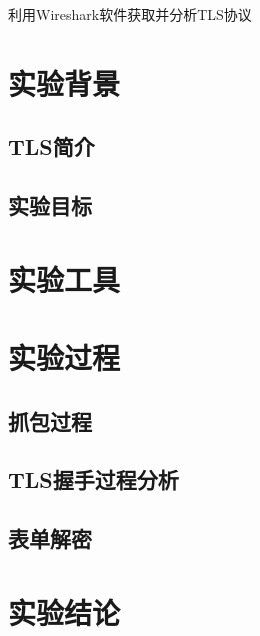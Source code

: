 \begin{center}
	\large{利用Wireshark软件获取并分析TLS协议}\\
\end{center}
\begin{flushleft}
	\tableofcontents
	\section{实验背景}
		\subsection{TLS简介}
			
		\subsection{实验目标}
			
	\section{实验工具}
		
	\section{实验过程}
		\subsection{抓包过程}
			
		\subsection{TLS握手过程分析}
			
		\subsection{表单解密}
			
	\section{实验结论}
	
\end{flushleft}